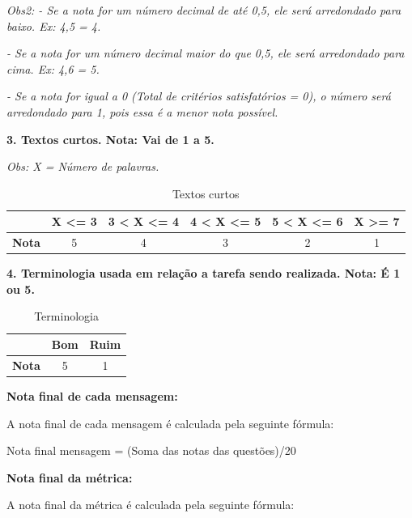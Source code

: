 \begin{apendicesenv}
\textit{Obs2: 
- Se a nota for um número decimal de até 0,5, ele será arredondado para baixo. Ex: 4,5 = 4.}

\textit{- Se a nota for um número decimal maior do que 0,5, ele será arredondado para cima. Ex: 4,6 = 5.}

\textit{- Se a nota for igual a 0 (Total de critérios satisfatórios = 0), o número será arredondado para 1, pois essa é a menor nota possível.}

\textbf{3.	Textos curtos. Nota: Vai de 1 a 5.}
	
\textit{	Obs: X = Número de palavras.
}

\begin{table}[htbp]
  \centering
  \caption{Textos curtos}
    \begin{tabular}{rc|c|c|c|c}
    \toprule
          & \textbf{X <= 3} & \textbf{3 < X <= 4} & \textbf{4 < X <= 5} & \textbf{5 < X <= 6} & \textbf{X >= 7} \\
    \midrule
    \multicolumn{1}{c}{\textbf{Nota}} & 5     & 4     & 3     & 2     & 1 \\
    \bottomrule
    \end{tabular}%
  \label{textos_curtos}%
\end{table}%

\textbf{4.	Terminologia usada em relação a tarefa sendo realizada. Nota: É 1 ou 5.}
\begin{table}[htbp]
  \centering
  \caption{Terminologia}
    \begin{tabular}{ccc}
    \toprule
          & \textbf{Bom} & \textbf{Ruim} \\
    \midrule
    \textbf{Nota} & 5     & 1 \\
    \bottomrule
    \end{tabular}%
  \label{Terminologia}%
\end{table}%

\textbf{Nota final de cada mensagem:}

	A nota final de cada mensagem é calculada pela seguinte fórmula:

Nota final mensagem = (Soma das notas das questões)/20	

\textbf{Nota final da métrica:}

A nota final da métrica é calculada pela seguinte fórmula:


\end{apendicesenv}
